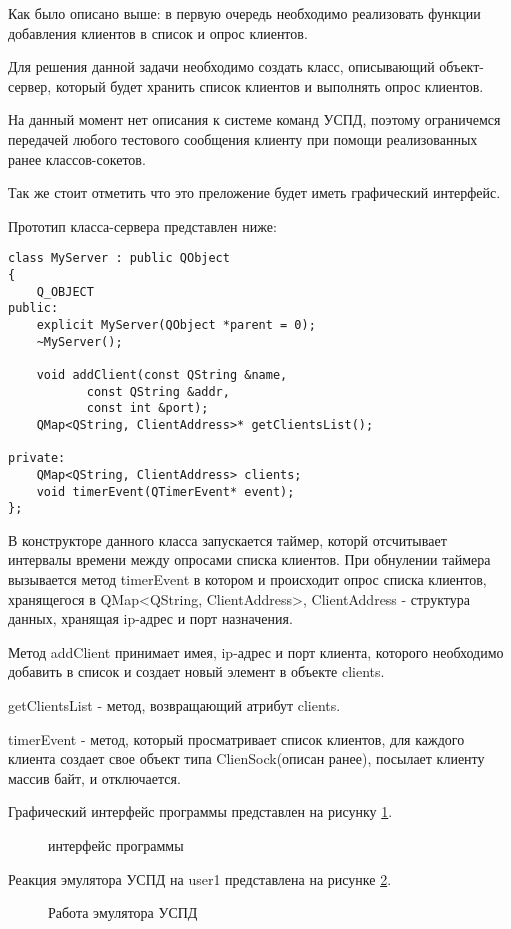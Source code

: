 Как было описано выше: в первую очередь необходимо реализовать функции добавления клиентов в список и опрос клиентов. 

Для решения данной задачи необходимо создать класс, описывающий объект-сервер, который будет хранить список клиентов и выполнять опрос клиентов.

На данный момент нет описания к системе команд УСПД, поэтому ограничемся передачей любого тестового сообщения клиенту при помощи реализованных ранее классов-сокетов.

Так же стоит отметить что это преложение будет иметь графический интерфейс.

Прототип класса-сервера представлен ниже:

\begin{lstlisting}
class MyServer : public QObject
{
    Q_OBJECT
public:
    explicit MyServer(QObject *parent = 0);
    ~MyServer();

    void addClient(const QString &name, 
		   const QString &addr, 
		   const int &port);
    QMap<QString, ClientAddress>* getClientsList();

private:
    QMap<QString, ClientAddress> clients;
    void timerEvent(QTimerEvent* event);
};
\end{lstlisting}

В конструкторе данного класса запускается таймер, которй отсчитывает интервалы времени между опросами списка клиентов. При обнулении таймера вызывается метод timerEvent в котором и происходит опрос списка клиентов, хранящегося в QMap<QString, ClientAddress>, ClientAddress - структура данных, хранящая ip-адрес и порт назначения.

Метод addClient принимает имея, ip-адрес и порт клиента, которого необходимо добавить в список и создает новый элемент в объекте clients.

getClientsList - метод, возвращающий атрибут clients.

timerEvent - метод, который просматривает список клиентов, для каждого клиента создает свое объект типа ClienSock(описан ранее), посылает клиенту массив байт, и отключается. 

\newpage
Графический интерфейс программы представлен на рисунку \ref{server_gui:server_gui}.

\begin{figure}[ht!]
 \caption{интерфейс программы}
 \label{server_gui:server_gui}
\end{figure}

Реакция эмулятора УСПД на user1 представлена на рисунке \ref{client_log:client_log}.

\begin{figure}[ht!]
 \caption{Работа эмулятора УСПД}
 \label{client_log:client_log}
\end{figure}




